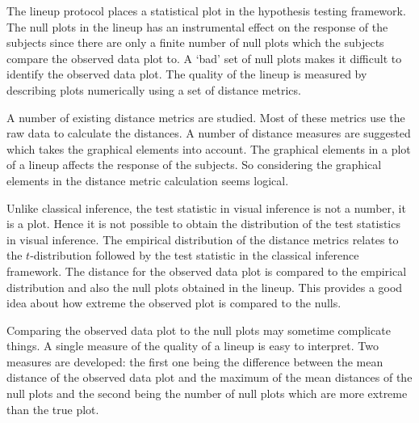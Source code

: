 \documentclass[12]{article}
\begin{document}
The lineup protocol places a statistical plot in the hypothesis testing framework. The null plots in the lineup has an instrumental effect on the response of the subjects since there are only a finite number of null plots which the subjects compare the observed data plot to. A `bad' set of null plots makes it difficult to identify the observed data plot. The quality of the lineup is measured by describing plots numerically using a set of distance metrics. 

A number of existing distance metrics are studied. Most of these metrics use the raw data to calculate the distances. A number of distance measures are suggested which takes the graphical elements into account. The graphical elements in a plot of a lineup affects the response of the subjects. So considering the graphical elements in the distance metric calculation seems logical.

Unlike classical inference, the test statistic in visual inference is not a number, it is a plot. Hence it is not possible to obtain the distribution of the test statistics in visual inference. The empirical distribution of the distance metrics relates to the $t$-distribution followed by the test statistic in the classical inference framework. The distance for the observed data plot is compared to the empirical distribution and also the null plots obtained in the lineup. This provides a good idea about how extreme the observed plot is compared to the nulls.

Comparing the observed data plot to the null plots may sometime complicate things. A single measure of the quality of a lineup is easy to interpret. Two measures are developed: the first one being the difference between the mean distance of the observed data plot and the maximum of the mean distances of the null plots and the second being the number of null plots which are more extreme than the true plot.


 
%
\end{document}
